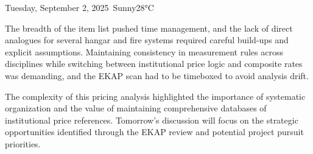 \begin{dailyentry}{Tuesday, September 2, 2025}{\weathersunny\ Sunny}{28°C}
\begin{challenges}
\item[] The breadth of the item list pushed time management, and the lack of direct analogues for several hangar and fire systems required careful build-ups and explicit assumptions. Maintaining consistency in measurement rules across disciplines while switching between institutional price logic and composite rates was demanding, and the EKAP scan had to be timeboxed to avoid analysis drift.
\end{challenges}

\begin{dailynotes}
The complexity of this pricing analysis highlighted the importance of systematic organization and the value of maintaining comprehensive databases of institutional price references. Tomorrow's discussion will focus on the strategic opportunities identified through the EKAP review and potential project pursuit priorities.
\end{dailynotes}

\begin{approvalsection}
\end{approvalsection}

\end{dailyentry}
